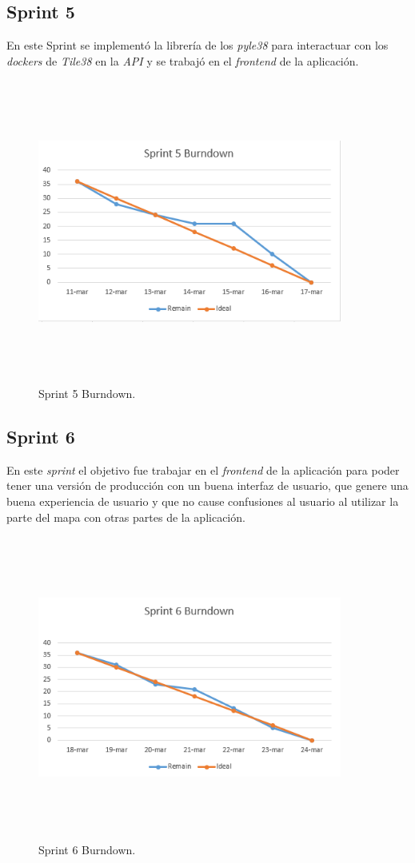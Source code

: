 \subsection{Sprint 5}

En este Sprint se implementó la librería de los \textit{pyle38} para interactuar con los \textit{dockers} de \textit{Tile38} en la \textit{API} y se trabajó en el \textit{frontend} de la aplicación.
\begin{figure}[H]
    \centering
    \includegraphics[width=10cm,height=10cm,keepaspectratio]{img/Sprint5_burndow.png}
    \caption{Sprint 5 Burndown.}
    \label{fig:sprint5_burndown}
\end{figure}
\subsection{Sprint 6}
En este \textit{sprint} el objetivo fue trabajar en el \textit{frontend} de la aplicación para poder tener una versión de producción con un buena interfaz de usuario, que genere una buena experiencia de usuario y que no cause confusiones al usuario al utilizar la parte del mapa con otras partes de la aplicación.
\begin{figure}[H]
    \centering
    \includegraphics[width=10cm,height=10cm,keepaspectratio]{img/Sprint6_burndow.png}
    \caption{Sprint 6 Burndown.}
    \label{fig:sprint6_burndown}
\end{figure}
